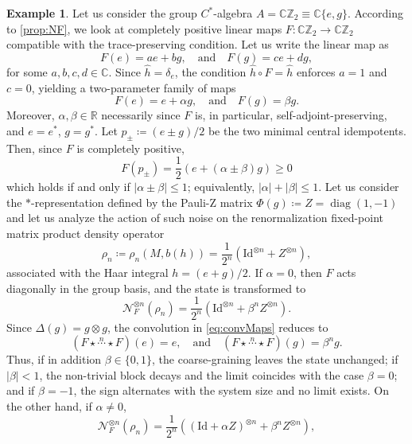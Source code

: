 \documentclass[a4paper,10pt]{amsart}
\newcommand{\Noisy}{\mathcal{N}}
\theoremstyle{definition}
\newtheorem{example}[theorem]{Example}
\begin{document}
\begin{example}
    Let us consider the group $C^*$-algebra $A=\mathbb{C}\mathbb{Z}_2 \equiv \mathbb{C}\{e,g\}$.
    According to \cref{prop:NF}, we look at completely positive linear maps
    $F : \mathbb{C}\mathbb{Z}_2 \to \mathbb{C}\mathbb{Z}_2$
    compatible with the trace-preserving condition.
    Let us write the linear map as
    \[
        F(e) = a e + b g
        ,\quad\text{and}\quad
        F(g) = c e + d g,
    \]
    for some $a,b,c,d\in \mathbb{C}$.
    Since $\hat{h} = \delta_e$, the condition $\hat{h}\circ F = \hat{h}$ enforces $a = 1$ and $c = 0$, yielding
    a two-parameter family of maps
    \[
        F(e) = e + \alpha g
        , \quad \text{and} \quad
        F(g) = \beta g.
    \]
    Moreover, $\alpha,\beta\in\mathbb{R}$ necessarily since $F$ is, in particular, self-adjoint-preserving, and $e = e^*$, $g=g^*$.
    Let $p_{\pm} \coloneqq (e\pm g)/2$ be the two minimal central idempotents. Then, since $F$ is completely positive, 
    \[
        F(p_\pm) = \frac{1}{2} (e+(\alpha\pm\beta)g) \geq 0
    \]
    which holds if and only if $|\alpha\pm \beta|\leq 1$;
    equivalently, $|\alpha|+|\beta| \leq 1$.
    \smallbreak\noindent%
    Let us consider the $*$-representation defined by the Pauli-Z matrix $\Phi(g) \coloneqq Z = \operatorname{diag}(1,-1)$ and let us analyze the action of such noise on the renormalization fixed-point matrix product density operator 
    \[
        \rho_n \coloneqq \rho_n(M,b(h))
        = 
        \frac{1}{2^{n}} (\mathrm{Id}^{\otimes n} + Z^{\otimes n}),
    \]
    associated with the Haar integral $h = (e+g)/2$.
    \smallbreak\noindent%
    If $\alpha=0$, then $F$ acts diagonally in the group basis, and the state is
    transformed to
    \[
        \Noisy_F^{\otimes n}(\rho_n)
        =
        \frac{1}{2^{n}}(\mathrm{Id}^{\otimes n} + \beta^n Z^{\otimes n}).
    \]
    Since $\Delta(g)=g\otimes g$, the convolution in \cref{eq:convMaps} reduces to
    \[
        (F \star \overset{n}\cdots \star F)(e) = e,
        \quad
        \text{and}
        \quad
        (F \star \overset{n}\cdots \star F)(g) = \beta^n g.
    \]
    Thus, if in addition $\beta\in\{0,1\}$, the coarse-graining leaves the state unchanged; if $|\beta|<1$,
    the non-trivial block decays and the limit coincides with the case $\beta=0$; and if
    $\beta=-1$, the sign alternates with the system size and no limit exists.
	\smallbreak\noindent%
	On the other hand, if $\alpha\neq 0$,
    \[
        \Noisy_F^{\otimes n}(\rho_n)
        =
        \frac{1}{2^{n}} ( (\mathrm{Id}+\alpha Z)^{\otimes n} + \beta^n Z^{\otimes n} ),
\]
\end{example}
\end{document}
